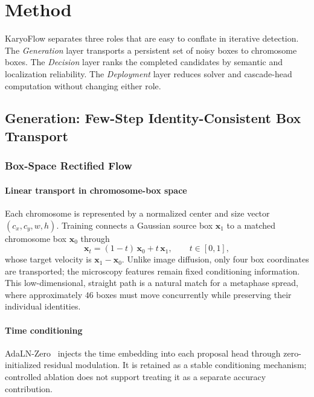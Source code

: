 \documentclass[journal,10pt]{IEEEtran}
\theoremstyle{definition}
\begin{document}
\section{Method}\label{sec:method}

KaryoFlow separates three roles that are easy to conflate in iterative
detection. The \emph{Generation} layer transports a persistent set of noisy
boxes to chromosome boxes. The \emph{Decision} layer ranks the completed
candidates by semantic and localization reliability. The \emph{Deployment}
layer reduces solver and cascade-head computation without changing either
role.

\subsection{Generation: Few-Step Identity-Consistent Box Transport}

\subsubsection{Box-Space Rectified Flow}\label{sec:method-rf}

\paragraph{Linear transport in chromosome-box space}
Each chromosome is represented by a normalized center and size vector
$(c_x,c_y,w,h)$. Training connects a Gaussian source box $\mathbf{x}_1$ to a
matched chromosome box $\mathbf{x}_0$ through
\begin{equation}\label{eq:rf-path}
  \mathbf{x}_t = (1-t)\, \mathbf{x}_0 + t\, \mathbf{x}_1, \qquad t \in [0,1],
\end{equation}
whose target velocity is $\mathbf{x}_1-\mathbf{x}_0$. Unlike image diffusion,
only four box coordinates are transported; the microscopy features remain
fixed conditioning information. This low-dimensional, straight path is a
natural match for a metaphase spread, where approximately $46$ boxes must move
concurrently while preserving their individual identities.

\paragraph{Time conditioning}
AdaLN-Zero~\cite{peebles2023dit} injects the time embedding into each
proposal head through zero-initialized residual modulation. It is retained as
a stable conditioning mechanism; controlled ablation does not support treating
it as a separate accuracy contribution.
\end{document}
